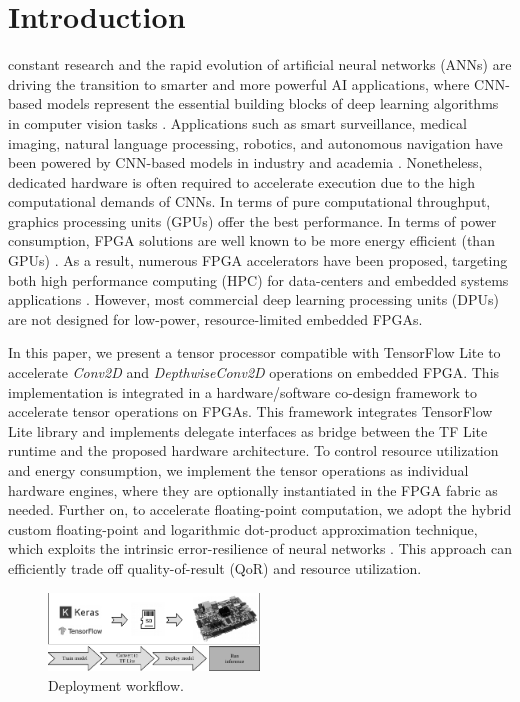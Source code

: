 
\section{Introduction}
\label{sec:introduction}
 constant research and the rapid evolution of artificial neural networks (ANNs) are driving the transition to smarter and more powerful AI applications, where CNN-based models represent the essential building blocks of deep learning algorithms in computer vision tasks \cite{hassaballah2020deep}. Applications such as smart surveillance, medical imaging, natural language processing, robotics, and autonomous navigation have been powered by CNN-based models in industry and academia \cite{dhillon2020convolutional}. Nonetheless, dedicated hardware is often required to accelerate execution due to the high computational demands of CNNs. In terms of pure computational throughput, graphics processing units (GPUs) offer the best performance. In terms of power consumption, FPGA solutions are well known to be more energy efficient (than GPUs) \cite{nurvitadhi2017can}. As a result, numerous FPGA accelerators have been proposed, targeting both high performance computing (HPC) for data-centers and embedded systems applications \cite{abdelouahab2018accelerating, moini2017resource, guo2017angel}. However, most commercial deep learning processing units (DPUs) are not designed for low-power, resource-limited embedded FPGAs.

In this paper, we present a tensor processor compatible with TensorFlow Lite to accelerate \emph{Conv2D} and \emph{DepthwiseConv2D} operations on embedded FPGA. This implementation is integrated in a hardware/software co-design framework to accelerate tensor operations on FPGAs. This framework integrates TensorFlow Lite library and implements delegate interfaces\cite{TensorFlowDelegate} as bridge between the TF Lite runtime and the proposed hardware architecture. To control resource utilization and energy consumption, we implement the tensor operations as individual hardware engines, where they are optionally instantiated in the FPGA fabric as needed. Further on, to accelerate floating-point computation, we adopt the hybrid custom floating-point and logarithmic dot-product approximation technique\cite{nevarez2021accelerating}, which exploits the intrinsic error-resilience of neural networks \cite{venkataramani2015approximate}. This approach can efficiently trade off quality-of-result (QoR) and resource utilization.

\begin{figure}[t!]
	\centering
	\includegraphics[width=0.5\textwidth]{../figures/workflow.pdf}
	\caption{Deployment workflow.}
	\label{fig:workflow}
\end{figure}

